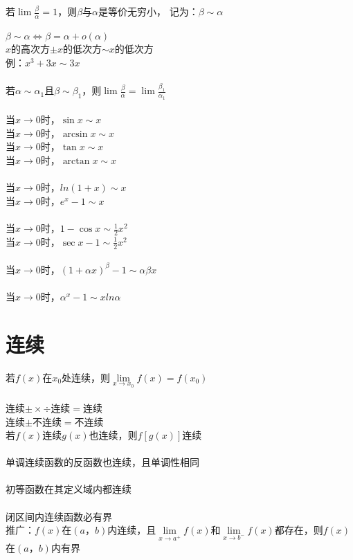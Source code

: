 \documentclass{article}
\begin{document}
\begin{flushleft}
	若$\lim \frac{\beta}{\alpha}=1$，则$\beta$与$\alpha$是等价无穷小，
	记为：$\beta \sim \alpha$\\
	~\\
	$\beta \sim \alpha \Leftrightarrow \beta = \alpha + o(\alpha)$\\
	$x$的高次方$\pm x$的低次方$\sim x$的低次方\\
	\qquad 例：$x^3+3x\sim 3x$\\
	~\\
	若$\alpha \sim \alpha_1$且$\beta \sim \beta_1$，则$\lim \frac{\beta}{\alpha} = \lim \frac{\beta_1}{\alpha_1}$\\
	~\\
	当$x\to 0$时，$\sin x \sim x$\\
	当$x\to 0$时，$\arcsin x \sim x$\\
	当$x\to 0$时，$\tan x \sim x$\\
	当$x\to 0$时，$\arctan x \sim x$\\
	~\\
	当$x\to 0$时，$ln(1+x) \sim x$\\
	当$x\to 0$时，$e^x-1 \sim x$\\
	~\\
	当$x\to 0$时，$1-\cos x \sim \frac{1}{2} x^2$\\
	当$x\to 0$时，$\sec x - 1 \sim \frac{1}{2} x^2$\\
	~\\
	当$x\to 0$时，$(1+\alpha x)^\beta -1 \sim \alpha\beta x$\\
	~\\
	当$x\to 0$时，$\alpha^x -1 \sim xln\alpha$\\
	
	\section{连续}
	
	若$f(x)$在$x_0$处连续，则$\lim\limits_{x\to x_0} f(x)=f(x_0)$\\
	~\\
	连续$\pm\times\div$连续$=$连续\\
	连续$\pm$不连续$=$不连续\\
	若$f(x)$连续$g(x)$也连续，则$f[g(x)]$连续\\
	~\\
	单调连续函数的反函数也连续，且单调性相同\\
	~\\
	初等函数在其定义域内都连续\\
	~\\
	闭区间内连续函数必有界\\
	推广：$f(x)$在$(a，b)$内连续，且$\lim\limits_{x\to a^+} f(x)$和$\lim\limits_{x\to b^-} f(x)$都存在，则$f(x)$在$(a，b)$内有界\\
	

\end{flushleft}
\end{document}
